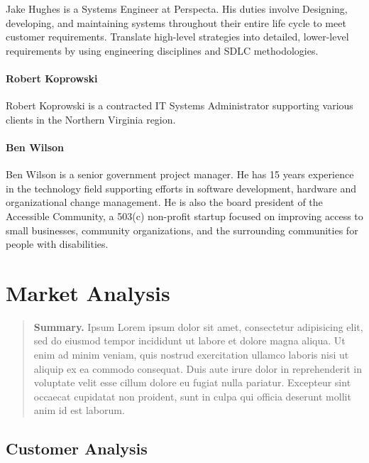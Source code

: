 \documentclass[9pt,]{book}
\begin{document}
Jake Hughes is a Systems Engineer at Perspecta. His duties involve
Designing, developing, and maintaining systems throughout their entire
life cycle to meet customer requirements. Translate high-level
strategies into detailed, lower-level requirements by using engineering
disciplines and SDLC methodologies.

\hypertarget{robert-koprowski}{%
\subsubsection{Robert Koprowski}\label{robert-koprowski}}

Robert Koprowski is a contracted IT Systems Administrator supporting
various clients in the Northern Virginia region.

\hypertarget{ben-wilson}{%
\subsubsection{Ben Wilson}\label{ben-wilson}}

Ben Wilson is a senior government project manager. He has 15 years
experience in the technology field supporting efforts in software
development, hardware and organizational change management. He is also
the board president of the Accessible Community, a 503(c) non-profit
startup focused on improving access to small businesses, community
organizations, and the surrounding communities for people with
disabilities.

\hypertarget{market-analysis}{%
\chapter{Market Analysis}\label{market-analysis}}

\begin{quote}
\textbf{Summary.} Ipsum Lorem ipsum dolor sit amet, consectetur
adipisicing elit, sed do eiusmod tempor incididunt ut labore et dolore
magna aliqua. Ut enim ad minim veniam, quis nostrud exercitation ullamco
laboris nisi ut aliquip ex ea commodo consequat. Duis aute irure dolor
in reprehenderit in voluptate velit esse cillum dolore eu fugiat nulla
pariatur. Excepteur sint occaecat cupidatat non proident, sunt in culpa
qui officia deserunt mollit anim id est laborum.
\end{quote}

\hypertarget{customer-analysis}{%
\section{Customer Analysis}\label{customer-analysis}}
\end{document}
